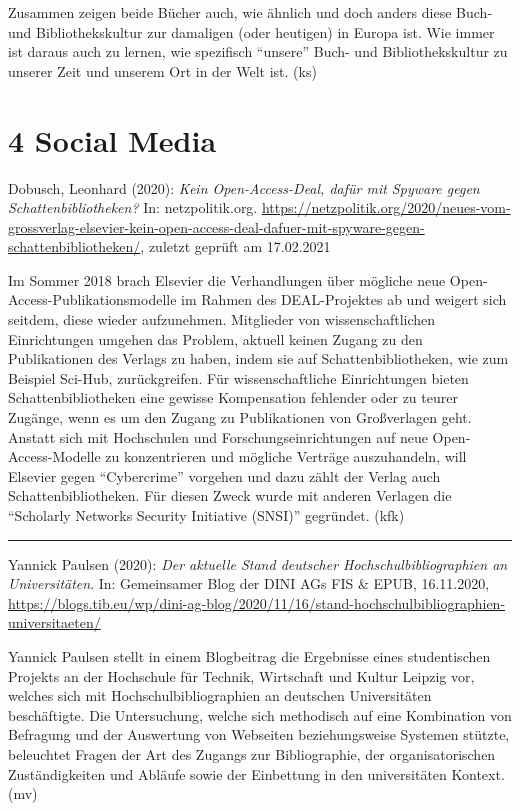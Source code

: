 \documentclass[a4paper,
fontsize=11pt,
oneside,
numbers=noperiodatend,
parskip=half-,
bibliography=totoc,
final
]{scrartcl}
\begin{document}
Zusammen zeigen beide Bücher auch, wie ähnlich und doch anders diese
Buch- und Bibliothekskultur zur damaligen (oder heutigen) in Europa ist.
Wie immer ist daraus auch zu lernen, wie spezifisch \enquote{unsere}
Buch- und Bibliothekskultur zu unserer Zeit und unserem Ort in der Welt
ist. (ks)

\pagebreak

\hypertarget{social-media}{%
\section{4 Social Media}\label{social-media}}

Dobusch, Leonhard (2020): \emph{Kein Open-Access-Deal, dafür mit Spyware
gegen Schattenbibliotheken?} In: netzpolitik.org.
\url{https://netzpolitik.org/2020/neues-vom-grossverlag-elsevier-kein-open-access-deal-dafuer-mit-spyware-gegen-schattenbibliotheken/},
zuletzt geprüft am 17.02.2021

Im Sommer 2018 brach Elsevier die Verhandlungen über mögliche neue
Open-Access-Publika\-tionsmodelle im Rahmen des DEAL-Projektes ab und
weigert sich seitdem, diese wieder aufzunehmen. Mitglieder von
wissenschaftlichen Einrichtungen umgehen das Problem, aktuell keinen
Zugang zu den Publikationen des Verlags zu haben, indem sie auf
Schattenbibliotheken, wie zum Beispiel Sci-Hub, zurückgreifen. Für
wissenschaftliche Einrichtungen bieten Schattenbibliotheken eine gewisse
Kompensation fehlender oder zu teurer Zugänge, wenn es um den Zugang zu
Publikationen von Großverlagen geht. Anstatt sich mit Hochschulen und
Forschungseinrichtungen auf neue Open-Access-Modelle zu konzentrieren
und mögliche Verträge auszuhandeln, will Elsevier gegen
\enquote{Cybercrime} vorgehen und dazu zählt der Verlag auch
Schattenbibliotheken. Für diesen Zweck wurde mit anderen Verlagen die
\enquote{Scholarly Networks Security Initiative (SNSI)} gegründet. (kfk)

\begin{center}\rule{0.5\linewidth}{0.5pt}\end{center}

Yannick Paulsen (2020): \emph{Der aktuelle Stand deutscher
Hochschulbibliographien an Universitäten}. In: Gemeinsamer Blog der DINI
AGs FIS \& EPUB, 16.11.2020,
\url{https://blogs.tib.eu/wp/dini-ag-blog/2020/11/16/stand-hochschulbibliographien-universitaeten/}

Yannick Paulsen stellt in einem Blogbeitrag die Ergebnisse eines
studentischen Projekts an der Hochschule für Technik, Wirtschaft und
Kultur Leipzig vor, welches sich mit Hochschulbibliographien an
deutschen Universitäten beschäftigte. Die Untersuchung, welche sich
methodisch auf eine Kombination von Befragung und der Auswertung von
Webseiten beziehungsweise Systemen stützte, beleuchtet Fragen der Art
des Zugangs zur Bibliographie, der organisatorischen Zuständigkeiten und
Abläufe sowie der Einbettung in den universitäten Kontext. (mv)
\end{document}

